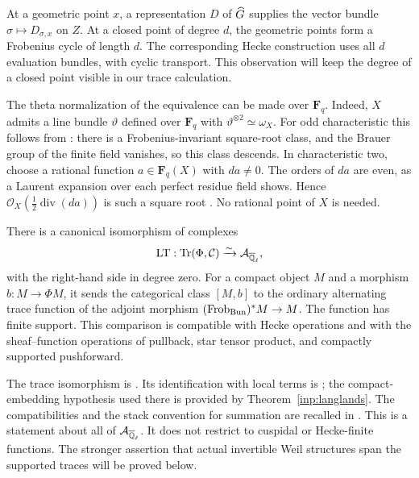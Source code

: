At a geometric point $x$, a representation $D$ of $\widehat G$ supplies the
vector bundle $\sigma\mapsto D_{\sigma,x}$ on $Z$.  At a closed point of
degree $d$, the geometric points form a Frobenius cycle of length $d$.
The corresponding Hecke construction uses all $d$ evaluation bundles,
with cyclic transport.  This observation will keep the degree of a
closed point visible in our trace calculation.

\begin{remark}\label{inp:theta}
The theta normalization of the equivalence can be made over $\mathbf F_q$.
Indeed, $X$ admits a line bundle $\vartheta$ defined over $\mathbf F_q$
with $\vartheta^{\otimes2}\simeq\omega_X$.
For odd characteristic this follows from
\cite[\S5, Remark~2 after Proposition~5.2, p.~61]{Atiyah}: there is a
Frobenius-invariant square-root class, and the Brauer group of the
finite field vanishes, so this class descends.  In characteristic two, choose a rational
function $a\in\mathbf F_q(X)$ with $da\ne0$.  The orders of $da$ are even,
as a Laurent expansion over each perfect residue field shows.  Hence
$\mathcal O_X(\tfrac12\operatorname{div}(da))$ is such a square root
\cite[\S4, p.~191]{Mumford}.  No rational point of $X$ is needed.
\end{remark}

\begin{theorem}\label{inp:trace}
There is a canonical isomorphism of complexes
\[
 \operatorname{LT}:\operatorname{Tr}(\Phi,\mathcal C)\xrightarrow{\sim}\mathcal A_{\overline{\mathbb Q}_{\ell}},
\]
with the right-hand side in degree zero.  For a compact object $M$ and
a morphism $b:M\to\Phi M$, it sends the categorical class $[M,b]$ to
the ordinary alternating trace function of the adjoint morphism
$(\operatorname{Frob}_{\operatorname{Bun}})^*M\to M$.  The function has finite support.
This comparison is compatible with Hecke operations and with the
sheaf--function operations of pullback, star tensor product, and
compactly supported pushforward.
\end{theorem}

The trace isomorphism is \cite[Theorem~0.2.6, equivalently
Corollary~4.1.4]{AGKRRV3}.  Its identification with local terms is
\cite[Theorem~0.6.8, equivalently Theorem~5.2.3, and
Remark~0.6.5]{AGKRRV3}; the compact-embedding hypothesis used there is
provided by Theorem~\ref{inp:langlands}.  The compatibilities and the
stack convention for summation are recalled in \cite[\S1.1]{GLR}.
This is a statement about all of $\mathcal A_{\overline{\mathbb Q}_{\ell}}$.  It does not restrict to
cuspidal or Hecke-finite functions.  The stronger assertion that actual
invertible Weil structures span the supported traces will be proved below.

